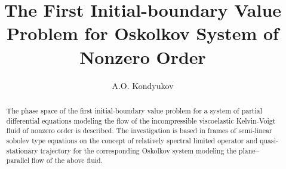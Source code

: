 \begin{englishtitle} %
\title{The First Initial-boundary Value Problem for Oskolkov System of Nonzero Order}
\author{A.O. Kondyukov}

\maketitle

\begin{abstract}
The phase space of the first initial-boundary value problem for a system of partial differential equations modeling the flow of the incompressible viscoelastic Kelvin-Voigt fluid of nonzero order is described. The investigation is based  in frames of semi-linear sobolev type equations on the concept of relatively spectral limited operator and quasi-stationary trajectory for the corresponding Oskolkov system modeling the plane--parallel flow of the above fluid.

\end{abstract}
\end{englishtitle}

\iffalse
%
%

